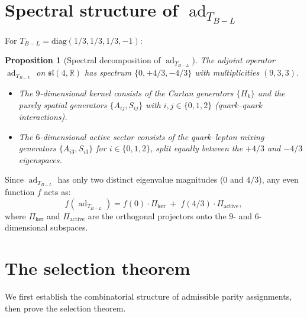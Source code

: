 \documentclass[11pt]{article}
\theoremstyle{plain}
\newtheorem{proposition}[theorem]{Proposition}
\theoremstyle{definition}
\theoremstyle{remark}
\newcommand{\sln}[1]{\mathfrak{sl}(#1,\mathbb{R})}
\newcommand{\TBL}{T_{B\!-\!L}}
\newcommand{\ad}{\operatorname{ad}}
\begin{document}
\section{Spectral structure of $\ad_{\TBL}$}

For $\TBL = \mathrm{diag}(1/3, 1/3, 1/3, -1)$:

\begin{proposition}[Spectral decomposition of $\ad_\TBL$]
\label{prop:spectrum}
The adjoint operator $\ad_\TBL$ on $\sln{4}$ has spectrum
$\{0, +4/3, -4/3\}$ with multiplicities $(9, 3, 3)$.
\begin{itemize}\itemsep0pt
  \item The $9$-dimensional kernel consists of the Cartan
    generators $\{H_k\}$ and the purely spatial generators
    $\{A_{ij}, S_{ij}\}$ with $i, j \in \{0,1,2\}$ (quark--quark
    interactions).
  \item The $6$-dimensional active sector consists of the
    quark--lepton mixing generators $\{A_{i3}, S_{i3}\}$ for
    $i \in \{0,1,2\}$, split equally between the $+4/3$ and
    $-4/3$ eigenspaces.
\end{itemize}
\end{proposition}

Since $\ad_\TBL$ has only two distinct eigenvalue magnitudes ($0$
and $4/3$), any even function $f$ acts as:
\begin{equation}\label{eq:f-spectral}
  f(\ad_\TBL) = f(0) \cdot \Pi_{\ker}
  \;+\; f(4/3) \cdot \Pi_{\mathrm{active}},
\end{equation}
where $\Pi_{\ker}$ and $\Pi_{\mathrm{active}}$ are the orthogonal
projectors onto the $9$- and $6$-dimensional subspaces.

\section{The selection theorem}

We first establish the combinatorial structure of admissible
parity assignments, then prove the selection theorem.
\end{document}
